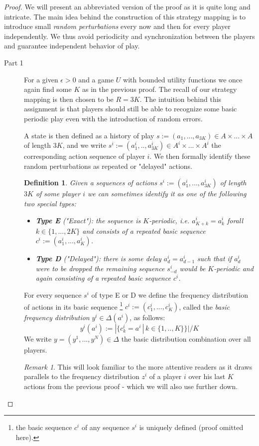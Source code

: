 \documentclass[a4paper]{article}
\theoremstyle{plain}
\newtheorem{definition}{Definition}
\theoremstyle{remark}
\newtheorem{remark}{Remark}
\begin{document}
\begin{proof}
	We will present an abbreviated version of the proof as it is quite long and intricate.
	The main idea behind the construction of this strategy mapping is to introduce
	small \emph{random perturbations} every now and then for every player independently.
	We thus avoid periodicity and synchronization between the players and guarantee independent behavior of play.
	
	\begin{description}
		\item[Part 1] For a given $\epsilon > 0$ and a game $U$ with bounded utility functions we once again
		find some $K$ as in the previous proof. The recall of our strategy mapping is then chosen to be $R=3K$.
		The intuition behind this assignment is that players should still be able to recognize some basic periodic play
		even with the introduction of random errors.
		
		\medskip
		A state is then defined as a history of play $s := (a_1, ..., a_{3K}) \in A \times ... \times A$ of length $3K$,
		and we write $s^i := (a^i_1, .., a^i_{3K}) \in A^i \times ... \times A^i$ the corresponding action sequence of player $i$. We then formally
		identify these random perturbations as repeated or "delayed" actions.
				
		\begin{definition}
			Given a sequences of actions $s^i := (a^i_1, ..., a^i_{3K})$ of length $3K$ of some player $i$ we can
			sometimes identify it as one of the following two special types:
			\begin{itemize}
				\item {\bf Type E} ("Exact"): the sequence is $K$-periodic, i.e. $a^i_{K+k} = a^i_k$ forall $k \in \{1, ..., 2K\}$
					and consists of a repeated \emph{basic} sequence $c^i := (a^i_1, ..., a^i_K)$. 
				\item {\bf Type D} ("Delayed"): there is some delay $a^i_d = a^i_{d-1}$ such that if $a^i_d$ were to
					be dropped the remaining sequence $s^i_{-d}$ would be $K$-periodic and again consisting
					of a repeated \emph{basic} sequence $c^i$.
			\end{itemize}
		\end{definition}
		For every sequence $s^i$ of type E or D we define the frequency distribution of actions in its basic sequence
		\footnote{the basic sequence $c^i$ of any sequence $s^i$ is uniquely defined (proof omitted here).} $c^i := (c^i_1, ..., c^i_K)$,
		called the \emph{basic frequency distribution} $y^i \in \Delta(a^i)$, as follows:
		\[
			y^i(a^i) := | \{ c^i_k = a^i \, | \, k \in \{1, .. , K\} \} | / K
		\]
		We write $y = (y^1, ..., y^N) \in \Delta$ the basic distribution combination over all players.
		\begin{remark}
			This will look familiar to the more attentive readers as it draws parallels
			to the frequency distribution $z^i$ of a player $i$ over his last $K$ actions
			from the previous proof - which we will also use further down.
		\end{remark}
		

\end{description}
\end{proof}
\end{document}
